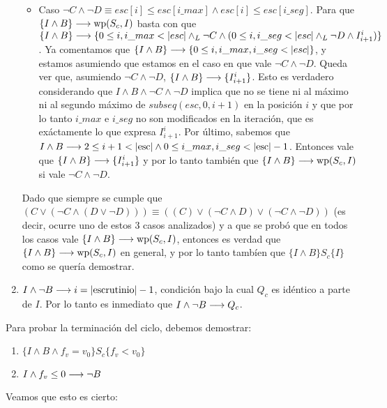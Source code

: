\documentclass[10pt,a4paper]{article}
\newcommand{\var}{\text}
\renewcommand{\wp}{\text{wp}}
\begin{document}
\begin{enumerate}
\begin{itemize}
        \item Caso $\neg C \land \neg D \equiv esc[i] \leq esc[i\_max] \land esc[i] \leq esc[i\_seg]$. Para que $\{I \land B\} \implica \wp(S_c, I)$ basta con que $\{I \land B\} \longrightarrow \{0 \leq i, i\_max < |esc| \land _L \neg C \land (0 \leq i, i\_seg < |esc| \land _L \neg D \land I_{i+1}^{i})\}$. Ya comentamos que $\{I \land B\} \longrightarrow \{0 \leq i, i\_max, i\_seg < |esc|\}$, y estamos asumiendo que estamos en el caso en que vale $\neg C \land \neg D$. Queda ver que, asumiendo $\neg C \land \neg D$, $\{I \land B\} \longrightarrow \{I_{i+1}^{i}\}$. Esto es verdadero considerando que $I \land B \land \neg C \land \neg D$ implica que no se tiene ni al máximo ni al segundo máximo de $subseq(esc, 0, i+1)$ en la posición $i$ y que por lo tanto $i\_max$ e $i\_seg$ no son modificados en la iteración, que es exáctamente lo que expresa $I_{i+1}^{i}$. Por último, sabemos que $I \land B \implica 2 \leq i + 1 < |\var{esc}| \land 0 \leq i\_max, i\_seg < |\var{esc}| - 1$. Entonces vale que $\{I \land B\} \longrightarrow \{I_{i+1}^{i}\}$ y por lo tanto también que $\{I \land B\} \implica \wp(S_c, I)$ si vale $\neg C \land \neg D$.
    \end{itemize}

    Dado que siempre se cumple que $(C \lor (\neg C \land (D \lor \neg D))) \equiv ((C) \lor (\neg C \land D) \lor (\neg C \land \neg D))$ (es decir, ocurre uno de estos 3 casos analizados) y a que se probó que en todos los casos vale $\{I \land B\} \implica \wp(S_c, I)$, entonces es verdad que $\{I \land B\} \implica \wp(S_c, I)$ en general, y por lo tanto tambíen que $\{I\land B\}S_c\{I\}$ como se quería demostrar.
    \item $I \land \neg B \implica i = |\var{escrutinio}| - 1$, condición bajo la cual $Q_c$ es idéntico a parte de $I$. Por lo tanto es inmediato que $I\land \neg B\longrightarrow Q_c$.
\end{enumerate}
Para probar la terminación del ciclo, debemos demostrar:
\begin{enumerate}
    \item $\{I \land B \land f_v = v_0\}S_c\{f_v < v_0\}$
    \item $I \land f_v \leq 0 \longrightarrow \neg B$
\end{enumerate}
Veamos que esto es cierto:
\end{document}
